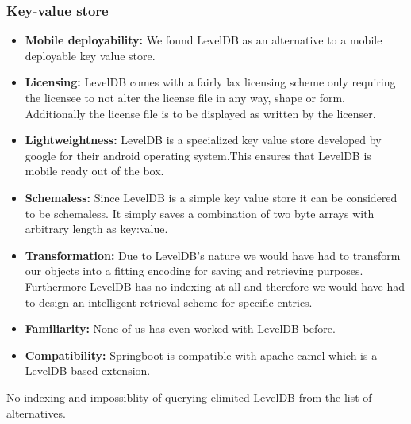\subsubsection{Key-value store}
\label{databaseKeyValueStore}
\begin{itemize}
\item \label{kv_req_one} \textbf{Mobile deployability:}
We found LevelDB as an alternative to a mobile deployable key value store.
\item \label{kv_req_two} \textbf{Licensing:}
LevelDB comes with a fairly lax licensing scheme only requiring the licensee to not alter the license file in any way, shape or form. Additionally the license file is to be displayed as written by the licenser.
\item \label{kv_item_three} \textbf{Lightweightness:}
LevelDB is a specialized key value store developed by google for their android operating system.This ensures that LevelDB is mobile ready out of the box.
\item \label{kv_req_four} \textbf{Schemaless:}
Since LevelDB is a simple key value store it can be considered to be schemaless. It simply saves a combination of two byte arrays with arbitrary length as key:value.
\item \label{kv_req_five} \textbf{Transformation:}
Due to LevelDB's nature we would have had to transform our objects into a fitting encoding for saving and retrieving purposes.
Furthermore LevelDB has no indexing at all and therefore we would have had to design an intelligent retrieval scheme for specific entries.
\item \label{kv_req_six} \textbf{Familiarity:}
None of us has even worked with LevelDB before.
\item \label{kv_req_seven} \textbf{Compatibility:}
Springboot is compatible with apache camel which is a LevelDB based extension.
\end{itemize}
No indexing and impossiblity of querying elimited LevelDB from the list of alternatives.

